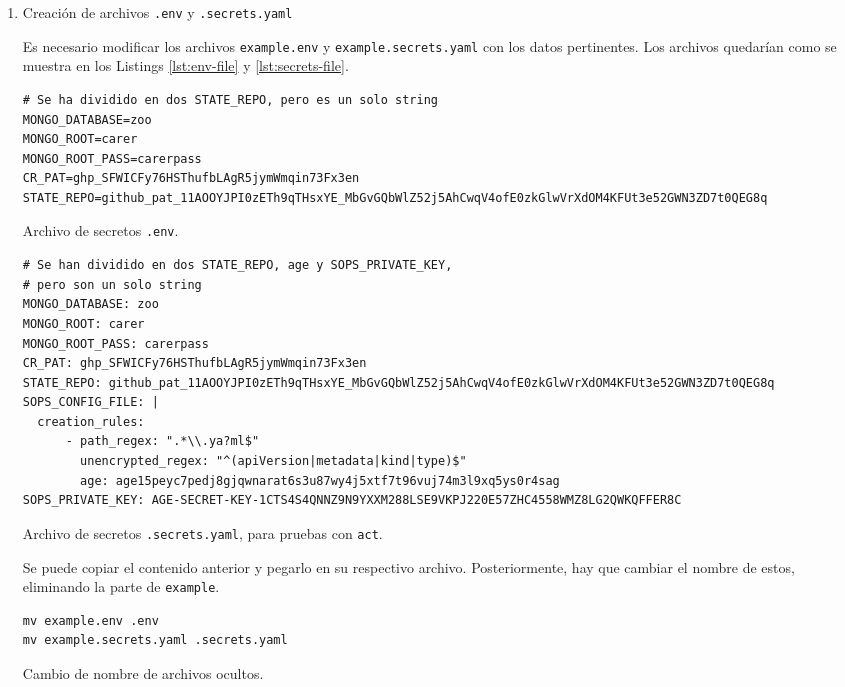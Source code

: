 \begin{enumerate}
  \item Creación de archivos \texttt{.env} y \texttt{.secrets.yaml}

    Es necesario modificar los archivos \texttt{example.env} y \texttt{example.secrets.yaml} con los datos pertinentes. Los archivos quedarían como se muestra en los Listings \ref{lst:env-file} y \ref{lst:secrets-file}.
  
\begin{listing}[!ht]
  \begin{verbatim}
# Se ha dividido en dos STATE_REPO, pero es un solo string
MONGO_DATABASE=zoo
MONGO_ROOT=carer
MONGO_ROOT_PASS=carerpass
CR_PAT=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
STATE_REPO=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
\end{verbatim}
\caption{Archivo de secretos \texttt{.env}.}
\label{lst:env-file}
\end{listing}

\begin{listing}[!ht]
  \begin{verbatim}
# Se han dividido en dos STATE_REPO, age y SOPS_PRIVATE_KEY,
# pero son un solo string
MONGO_DATABASE: zoo
MONGO_ROOT: carer
MONGO_ROOT_PASS: carerpass
CR_PAT: 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
STATE_REPO: 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
SOPS_CONFIG_FILE: |
  creation_rules:
      - path_regex: ".*\\.ya?ml$"
        unencrypted_regex: "^(apiVersion|metadata|kind|type)$"
        age: age15peyc7pedj8gjqwnarat6s3u87wy4j5xtf7t96vuj74m3l9xq5ys0r4sag
SOPS_PRIVATE_KEY: AGE-SECRET-KEY-1CTS4S4QNNZ9N9YXXM288LSE9VKPJ220E57ZHC4558WMZ8LG2QWKQFFER8C
\end{verbatim}
\caption{Archivo de secretos \texttt{.secrets.yaml}, para pruebas con \texttt{act}.}
\label{lst:secrets-file}
\end{listing}

Se puede copiar el contenido anterior y pegarlo en su respectivo archivo. Posteriormente, hay que cambiar el nombre de estos, eliminando la parte de \texttt{example}.

\begin{listing}[!ht]
  \begin{verbatim}
mv example.env .env
mv example.secrets.yaml .secrets.yaml
\end{verbatim}
\caption{Cambio de nombre de archivos ocultos.}
\end{listing}


\end{enumerate}
